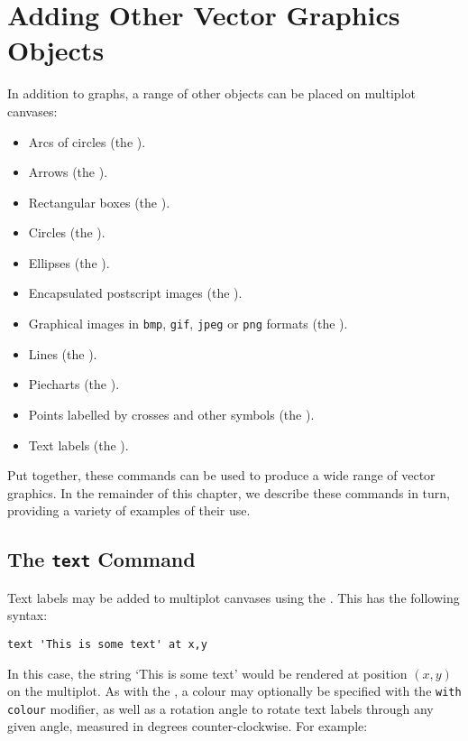 \section{Adding Other Vector Graphics Objects}

In addition to graphs, a range of other objects can be placed on multiplot
canvases:
\begin{itemize}
\item Arcs of circles (the ).
\item Arrows (the ).
\item Rectangular boxes (the ).
\item Circles (the ).
\item Ellipses (the ).
\item Encapsulated postscript images (the ).
\item Graphical images in {\tt bmp}, {\tt gif}, {\tt jpeg} or {\tt png} formats (the ).
\item Lines (the ).
\item Piecharts (the ).
\item Points labelled by crosses and other symbols (the ).
\item Text labels (the ).
\end{itemize}
Put together, these commands can be used to produce a wide range of vector
graphics. In the remainder of this chapter, we describe these commands in turn,
providing a variety of examples of their use.

\subsection{The {\tt text} Command}

Text labels may be added to multiplot canvases using the . This
has the following syntax:

\begin{verbatim}
text 'This is some text' at x,y
\end{verbatim}

In this case, the string `This is some text' would be rendered at position
$(x,y)$ on the multiplot. As with the , a colour may
optionally be specified with the {\tt with colour} modifier, as well as a
rotation angle to rotate text labels through any given angle, measured in
degrees counter-clockwise. For example:

